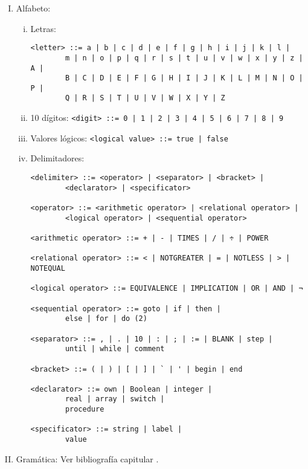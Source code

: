 \begin{enumerate}[I.]

\item Alfabeto:

\begin{enumerate}[i.]

\item Letras:

\begin{verbatim}
<letter> ::= a | b | c | d | e | f | g | h | i | j | k | l |
        m | n | o | p | q | r | s | t | u | v | w | x | y | z | A |
        B | C | D | E | F | G | H | I | J | K | L | M | N | O | P |
        Q | R | S | T | U | V | W | X | Y | Z
\end{verbatim}

\item 10 dígitos: \texttt{<digit> ::= 0 | 1 | 2 | 3 | 4 | 5 | 6 | 7 | 8 | 9 }

\item Valores lógicos: \texttt{<logical value> ::= true | false}

\item Delimitadores:
\begin{verbatim}
<delimiter> ::= <operator> | <separator> | <bracket> |
        <declarator> | <specificator>

<operator> ::= <arithmetic operator> | <relational operator> |
        <logical operator> | <sequential operator>

<arithmetic operator> ::= + | - | TIMES | / | ÷ | POWER

<relational operator> ::= < | NOTGREATER | = | NOTLESS | > | NOTEQUAL

<logical operator> ::= EQUIVALENCE | IMPLICATION | OR | AND | ¬

<sequential operator> ::= goto | if | then |
        else | for | do (2)

<separator> ::= , | . | 10 | : | ; | := | BLANK | step |
        until | while | comment

<bracket> ::= ( | ) | [ | ] | ` | ' | begin | end

<declarator> ::= own | Boolean | integer |
        real | array | switch |
        procedure

<specificator> ::= string | label |
        value
\end{verbatim}

\end{enumerate}

\item Gramática: Ver bibliografía capitular .

\end{enumerate}

